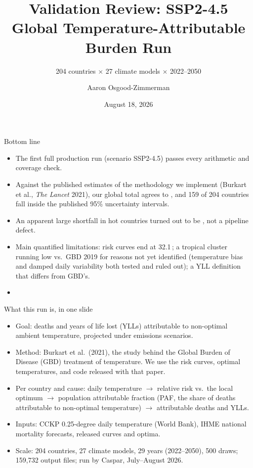 \documentclass[aspectratio=169,11pt]{beamer}
\title{Validation Review: SSP2-4.5 Global Temperature-Attributable Burden Run}
\subtitle{204 countries \(\times\) 27 climate models \(\times\) 2022--2050}
\author{Aaron Osgood-Zimmerman}
\institute{OZ Labs LLC, for the World Bank climate-health project}
\date{August 18, 2026}
\begin{document}
\begin{frame}
  \titlepage
\end{frame}

\begin{frame}{Bottom line}
  \begin{itemize}
    \item The first full production run (scenario SSP2-4.5) passes every
      arithmetic and coverage check.
    \item Against the published estimates of the methodology we implement
      (Burkart et al., \textit{The Lancet} 2021), our global total agrees to
      , and 159 of 204 countries fall inside the published
      95\% uncertainty intervals.
    \item An apparent large shortfall in hot countries turned out to be
      , not a pipeline
      defect.
    \item Main quantified limitations: risk curves end at
      32.1\,\textcelsius{}; a tropical cluster running low vs.\ GBD 2019
      for reasons not yet identified (temperature bias and damped daily
      variability both tested and ruled out); a YLL definition that differs
      from GBD's.
    \item {}
  \end{itemize}
\end{frame}

\begin{frame}{What this run is, in one slide}
  \begin{itemize}
    \item Goal: deaths and years of life lost (YLLs) attributable to
      non-optimal ambient temperature, projected under emissions scenarios.
    \item Method: Burkart et al.\ (2021), the study behind the Global Burden
      of Disease (GBD) treatment of temperature. We use the risk curves,
      optimal temperatures, and code released with that paper.
    \item Per country and cause: daily temperature \(\rightarrow\) relative
      risk vs.\ the local optimum \(\rightarrow\) population attributable
      fraction (PAF, the share of deaths attributable to non-optimal
      temperature) \(\rightarrow\) attributable deaths and YLLs.
    \item Inputs: CCKP 0.25-degree daily temperature (World Bank), IHME
      national mortality forecasts, released curves and optima.
    \item Scale: 204 countries, 27 climate models, 29 years (2022--2050),
      500 draws; 159{,}732 output files; run by Caspar, July--August 2026.
  \end{itemize}
\end{frame}
\end{document}
